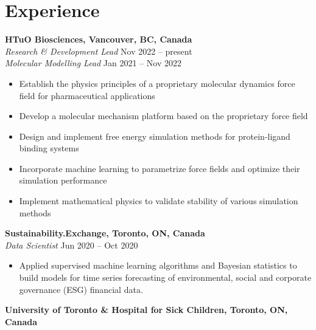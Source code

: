 \documentclass[11pt]{../yhlcv}
\begin{document}
\section*{Experience}

{\bf HTuO Biosciences, Vancouver, BC, Canada}\vspace{0.2em} \\

{\it Research \& Development Lead}  \hfill Nov 2022 -- present\vspace{0.2em}\\
{\it Molecular Modelling Lead} \hfill Jan 2021 -- Nov 2022\vspace{-0.5em}\\
\begin{itemize}[leftmargin=*]\itemsep-0.2em
\item Establish the physics principles of a proprietary molecular dynamics force field for pharmaceutical applications
\item Develop a molecular mechanism platform based on the proprietary force field
\item Design and implement free energy simulation methods for protein-ligand binding systems
\item Incorporate machine learning to parametrize force fields and optimize their simulation performance
\item Implement mathematical physics to validate stability of various simulation methods
\end{itemize}

{\bf Sustainability.Exchange, Toronto, ON, Canada}\vspace{0.2em} \\

{\it Data Scientist} \hfill Jun 2020 -- Oct 2020\vspace{-0.5em}\\
\begin{itemize}[leftmargin=*]\itemsep-0.2em
\item Applied supervised machine learning algorithms and Bayesian statistics to build models for time series
forecasting of environmental, social and corporate governance (ESG) financial data.
\end{itemize}

{\bf University of Toronto \& Hospital for Sick Children, Toronto, ON, Canada}\vspace{0.2em}
\end{document}
